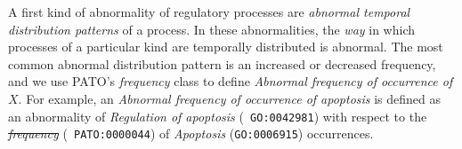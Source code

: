 \documentclass{bioinfo}
\providecommand{\DIFadd}[1]{{\protect\color{blue}\uwave{#1}}} %
\providecommand{\DIFdel}[1]{{\protect\color{red}\sout{#1}}}                      %
\providecommand{\DIFaddbegin}{} %
\providecommand{\DIFaddend}{} %
\providecommand{\DIFdelbegin}{} %
\providecommand{\DIFdelend}{} %
\begin{document}

A first kind of abnormality of regulatory processes are {\em abnormal
  temporal distribution patterns} of a process. In these
abnormalities, the {\em way} in which processes of a particular kind
are temporally distributed is abnormal.  The most common abnormal
distribution pattern is an increased or decreased frequency, and we
use PATO's {\em frequency} class to define {\em Abnormal frequency of
  occurrence of $X$}.
For example, an {\em Abnormal frequency of occurrence of apoptosis} is
defined as an abnormality of {\em Regulation of apoptosis} ({\tt
  GO:0042981}) with respect to the {\em \DIFdelbegin \DIFdel{frequency}\DIFdelend \DIFaddbegin \DIFadd{Frequency}\DIFaddend } ({\tt
  PATO:0000044}) of {\em Apoptosis} ({\tt GO:0006915}) occurrences.
\end{document}
